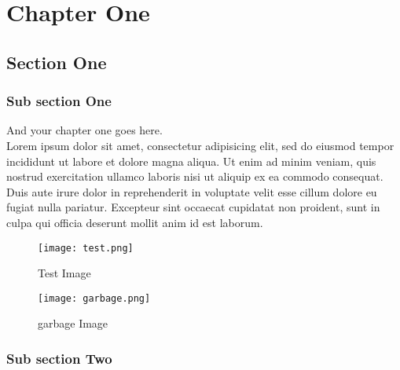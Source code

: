 \chapter{Chapter One}%
\label{chap:chapter_one}

\section{Section One}
\label{chap:section_one}

  \subsection{Sub section One}

  And your chapter one goes here\cite{web001}\@. ~\\
  Lorem ipsum dolor sit amet, consectetur adipisicing elit, sed do eiusmod
  tempor incididunt ut labore et dolore magna aliqua. Ut enim ad minim veniam,
  quis nostrud exercitation ullamco laboris nisi ut aliquip ex ea commodo
  consequat. Duis aute irure dolor in reprehenderit in voluptate velit esse
  cillum dolore eu fugiat nulla pariatur. Excepteur sint occaecat cupidatat non
  proident, sunt in culpa qui officia deserunt mollit anim id est laborum.

  \begin{figure}[H]%
    \center%
    \texttt{[image: test.png]}%
    \caption[This is a test image]{Test Image}\label{fig:test}%
  \end{figure}
  
   \begin{figure}[H]%
    \center%
    \texttt{[image: garbage.png]}%
    \caption[This is a test image]{garbage Image}\label{fig:test}%
  \end{figure}

  \subsection{Sub section Two}

